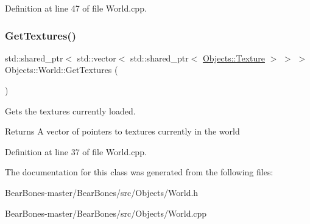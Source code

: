 Definition at line 47 of file World.\+cpp.

\mbox{\label{class_objects_1_1_world_a64f1de04ba2b729474135a8af6ac3163}} 
\subsubsection{\texorpdfstring{Get\+Textures()}{GetTextures()}}
{\footnotesize\ttfamily std\+::shared\+\_\+ptr$<$ std\+::vector$<$ std\+::shared\+\_\+ptr$<$ \hyperlink{class_objects_1_1_texture}{Objects\+::\+Texture} $>$ $>$ $>$ Objects\+::\+World\+::\+Get\+Textures (\begin{DoxyParamCaption}{ }\end{DoxyParamCaption})}

Gets the textures currently loaded. \begin{DoxyReturn}{Returns}
A vector of pointers to textures currently in the world 
\end{DoxyReturn}


Definition at line 37 of file World.\+cpp.



The documentation for this class was generated from the following files\+:\begin{DoxyCompactItemize}
\item 
Bear\+Bones-\/master/\+Bear\+Bones/src/\+Objects/World.\+h\item 
Bear\+Bones-\/master/\+Bear\+Bones/src/\+Objects/World.\+cpp\end{DoxyCompactItemize}
